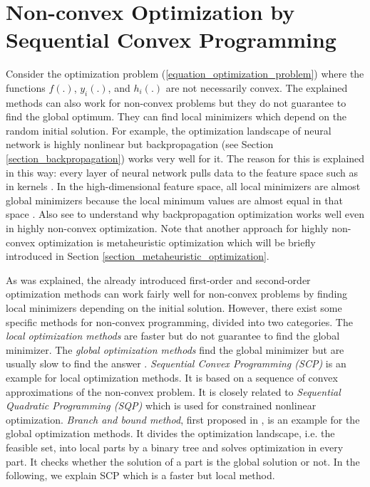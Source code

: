 \documentclass[lang=cn,10pt]{gorgeousnbook}
\numberwithin{equation}{section}%
\numberwithin{figure}{section}%
\begin{document}
\section{Non-convex Optimization by Sequential Convex Programming} 

Consider the optimization problem (\ref{equation_optimization_problem}) where the functions $f(.)$, $y_i(.)$, and $h_i(.)$ are not necessarily convex. 
The explained methods can also work for non-convex problems but they do not guarantee to find the global optimum. 
They can find local minimizers which depend on the random initial solution. 
For example, the optimization landscape of neural network is highly nonlinear but backpropagation (see Section \ref{section_backpropagation}) works very well for it. The reason for this is explained in this way: every layer of neural network pulls data to the feature space such as in kernels \cite{ghojogh2021reproducing}. In the high-dimensional feature space, all local minimizers are almost global minimizers because the local minimum values are almost equal in that space \cite{feizi2017porcupine}. Also see \cite{soltanolkotabi2018theoretical,allen2019learning,allen2019convergence} to understand why backpropagation optimization works well even in highly non-convex optimization. 
Note that another approach for highly non-convex optimization is metaheuristic optimization which will be briefly introduced in Section \ref{section_metaheuristic_optimization}.

As was explained, the already introduced first-order and second-order optimization methods can work fairly well for non-convex problems by finding local minimizers depending on the initial solution. However, there exist some specific methods for non-convex programming, divided into two categories. The \textit{local optimization methods} are faster but do not guarantee to find the global minimizer. The \textit{global optimization methods} find the global minimizer but are usually slow to find the answer \cite{duchi2018sequential}. \textit{Sequential Convex Programming (SCP)} \cite{dinh2010local} is an example for local optimization methods. It is based on a sequence of convex approximations of the non-convex problem. It is closely related to \textit{Sequential Quadratic Programming (SQP)} \cite{boggs1995sequential} which is used for constrained nonlinear optimization.
\textit{Branch and bound method}, first proposed in \cite{land1960automatic}, is an example for the global optimization methods. It divides the optimization landscape, i.e. the feasible set, into local parts by a binary tree and solves optimization in every part. It checks whether the solution of a part is the global solution or not. 
In the following, we explain SCP which is a faster but local method. 
\end{document}
